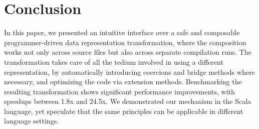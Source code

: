 \section{Conclusion}
\label{sec:concls}

In this paper, we presented an intuitive interface over a safe and
composable programmer-driven data representation transformation, where
the composition works not only across source files but also across
separate compilation runs.
The transformation takes care of all the tedium involved in using a
different representation, by automatically introducing coercions and
bridge methods where necessary, and optimizing the code via extension
methods. Benchmarking the resulting transformation shows significant
performance improvements, with speedups between 1.8x and 24.5x. We
demonstrated our mechanism in the Scala language, yet speculate that
the same principles can be applicable in different language settings.
